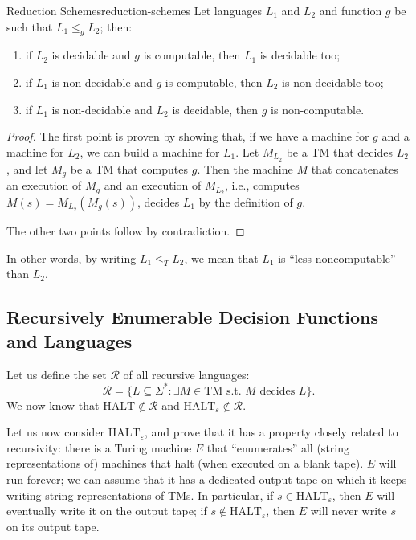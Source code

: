 \begin{theorem}{Reduction Schemes}{reduction-schemes}
    Let languages \(L_1\) and \(L_2\) and function \(g\) be such that \(L_1 \le_g L_2\); then:
    \begin{enumerate}
        \item if \(L_2\) is decidable and \(g\) is computable, then \(L_1\) is decidable too;
        \item if \(L_1\) is non-decidable and \(g\) is computable, then \(L_2\) is non-decidable too;
        \item if \(L_1\) is non-decidable and \(L_2\) is decidable, then \(g\) is non-computable.
    \end{enumerate}
    \begin{proof}
        The first point is proven by showing that, if we have a machine for \(g\) and a machine for \(L_2\), we can build a machine for \(L_1\). Let \(M_{L_2}\) be a TM that decides \(L_2\), and let \(M_g\) be a TM that computes \(g\). Then the machine \(M\) that concatenates an execution of \(M_g\) and an execution of \(M_{L_2}\), i.e., computes \(M(s) = M_{L_2}(M_g(s))\), decides \(L_1\) by the definition of \(g\).
        
        The other two points follow by contradiction.
    \end{proof}
\end{theorem}

\noindent In other words, by writing \(L_1 \le_T L_2\), we mean that \(L_1\) is ``less noncomputable'' than \(L_2\). 

\subsection{Recursively Enumerable Decision Functions and Languages}

Let us define the set \(\mathcal{R}\) of all recursive languages:
\[
\mathcal{R} = \{L \subseteq \Sigma^* : \exists M \in \text{TM s.t. } M \text{ decides } L\}.
\]
We now know that \(\text{HALT} \notin \mathcal{R}\) and \(\text{HALT}_\varepsilon \notin \mathcal{R}\).

Let us now consider \(\text{HALT}_\varepsilon\), and prove that it has a property closely related to recursivity: there is a Turing machine \(E\) that ``enumerates'' all (string representations of) machines that halt (when executed on a blank tape). \(E\) will run forever; we can assume that it has a dedicated output tape on which it keeps writing string representations of TMs. In particular, if \(s \in \text{HALT}_\varepsilon\), then \(E\) will eventually write it on the output tape; if \(s \notin \text{HALT}_\varepsilon\), then \(E\) will never write \(s\) on its output tape.

